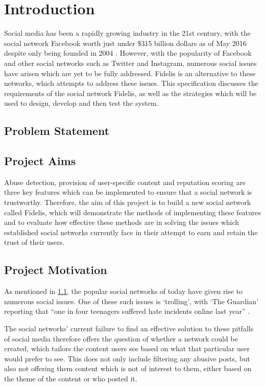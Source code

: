 \chapter{Introduction}
\label{Chapter:Introduction}

Social media has been a rapidly growing industry in the 21st century, with the social network Facebook worth just under \$315 billion dollars as of May 2016 despite only being founded in 2004 \cite{Forbes:Facebook}. However, with the popularity of Facebook and other social networks such as Twitter and Instagram, numerous social issues have arisen which are yet to be fully addressed. Fidelis is an alternative to these networks, which attempts to address these issues. This specification discusses the requirements of the social network Fidelis, as well as the strategies which will be used to design, develop and then test the system.

\section{Problem Statement}
\label{Sec:ProblemStatement}

\section{Project Aims}
Abuse detection, provision of user-specific content and reputation scoring are three key features which can be implemented to ensure that a social network is trustworthy. Therefore, the aim of this project is to build a new social network called Fidelis, which will demonstrate the methods of implementing these features and to evaluate how effective these methods are in solving the issues which established social networks currently face in their attempt to earn and retain the trust of their users.

\section{Project Motivation}
As mentioned in \ref{Sec:ProblemStatement}, the popular social networks of today have given rise to numerous social issues. One of these such issues is `trolling', with `The Guardian' reporting that ``one in four teenagers suffered hate incidents online last year'' \cite{Gani:Trolling}. 

The social networks' current failure to find an effective solution to these pitfalls of social media therefore offers the question of whether a network could be created, which tailors the content users see based on what that particular user would prefer to see. This does not only include filtering any abusive posts, but also not offering them content which is not of interest to them, either based on the theme of the content or who posted it.

